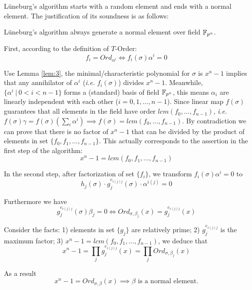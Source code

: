 L\"uneburg's algorithm starts with a random element and ends with a normal element. The justification of 
its soundness is as follows:
\begin{Proposition}
L\"uneburg's algorithm always generate a normal element over field ${\mathbb{F}}_{p^n}$.
\end{Proposition}

\begin{Proof}
First, according to the definition of $T$-Order:
$$f_i = Ord_{\alpha^i} \Leftrightarrow f_i(\sigma)\alpha^i = 0$$

Use Lemma \ref{lem:3}, the minimal/characteristic polynomial for $\sigma$ is $x^n-1$ implies that
any annihilator of $\alpha^i$ ({\it i.e.} $f_i(\sigma)$) divides $x^n-1$. Meanwhile, $\{\alpha^i~|~0<i<n-1\}$ forms a (standard) basis
of field ${\mathbb{F}}_{p^n}$, this means $\alpha_i$ are linearly independent with each other ($i=0,1,\dots,n-1$).
Since linear map $f(\sigma)$ guarantees that all elements in the field 
have order $lcm(f_0,\dots,f_{n-1})$, {\it i.e.} $f(\sigma)\gamma = f(\sigma)(\sum_i \alpha^i) \implies f(\sigma) = lcm(f_0,\dots,f_{n-1})$.
By contradiction we can prove that there is no factor of $x^n-1$ that can be divided by the product 
of elements in set $\{f_0,f_1,\dots,f_{n-1}\}$. This actually corresponds to the assertion in the first step of the algorithm:
$$x^n-1 = lcm(f_0,f_1,\dots,f_{n-1})$$

In the second step, after factorization of set $\{f_i\}$, we transform $f_i(\sigma)\alpha^i=0$ to
$$h_j(\sigma)\cdot g_{j}^{e_{i(j)j}}(\sigma) \cdot \alpha^{i(j)} = 0$$

Furthermore we have 
$$g_{j}^{e_{i(j)j}}(\sigma)\beta_j = 0 \Leftrightarrow Ord_{\sigma,\beta_j}(x) = g_{j}^{e_{i(j)j}}(x)$$

Consider the facts: 1) elements in set $\{g_j\}$ are relatively prime; 2) $g_{j}^{e_{i(j)j}}$ is the maximum factor; 
3) $x^n-1 = lcm(f_0,f_1,\dots,f_{n-1})$, we deduce that 
$$x^n-1 = \prod_j g_{j}^{e_{i(j)j}}(x) = \prod_jOrd_{\sigma,\beta_j}(x)$$

As a result
$$x^n-1 = Ord_{\sigma,\beta}(x) \implies \beta\text{ is a normal element.}$$
\end{Proof}

